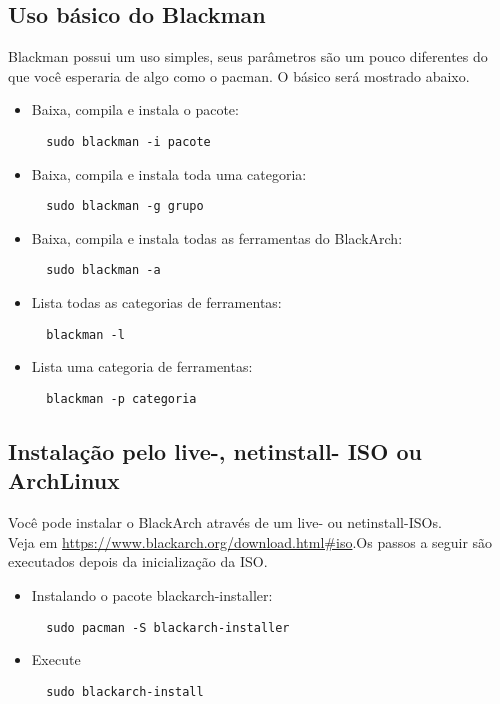 \documentclass[a4paper, oneside, 11pt]{book}
\begin{document}
\subsection{Uso básico do Blackman} Blackman possui um uso simples, seus parâmetros são um pouco diferentes do que você esperaria de algo como o pacman. O básico será mostrado abaixo.
\begin{itemize}
\item Baixa, compila e instala o pacote:
\begin{lstlisting}
  sudo blackman -i pacote
\end{lstlisting}

\item Baixa, compila e instala toda uma categoria:
\begin{lstlisting}
  sudo blackman -g grupo
\end{lstlisting}

\item Baixa, compila e instala todas as ferramentas do BlackArch:
\begin{lstlisting}
  sudo blackman -a
\end{lstlisting}

\item Lista todas as categorias de ferramentas:
\begin{lstlisting}
  blackman -l
\end{lstlisting}

\item Lista uma categoria de ferramentas:
\begin{lstlisting}
  blackman -p categoria 
\end{lstlisting}

\end{itemize}

\subsection{Instalação pelo live-, netinstall- ISO ou ArchLinux}
Você pode instalar o BlackArch através de um live- ou netinstall-ISOs.\\Veja em
\url{https://www.blackarch.org/download.html#iso}.Os passos a seguir são executados depois da inicialização da ISO.
\begin{itemize}
\item Instalando o pacote blackarch-installer:
\begin{lstlisting}
  sudo pacman -S blackarch-installer
\end{lstlisting}

\item Execute
\begin{lstlisting}
  sudo blackarch-install
\end{lstlisting}

\end{itemize}
\end{document}
